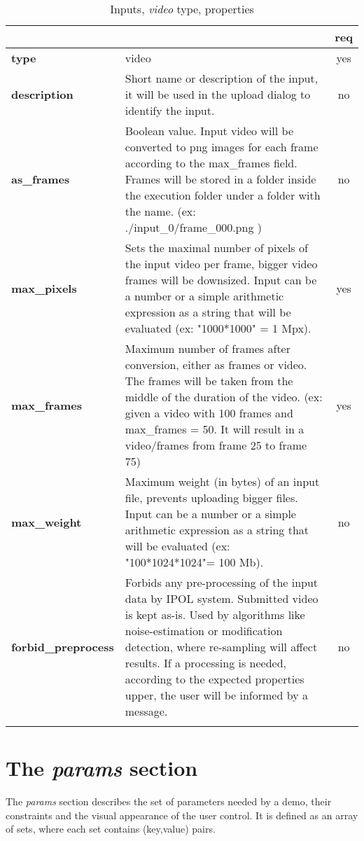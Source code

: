 \begin{longtable}{|>{\bf}L{\linewidth}|L{\linewidth}|c|}
\hline
{}     &  & {\bf req} \tabularnewline 
\hline \hline
 type         & video & yes \\ \hline
 description  & Short name or description of the input, it will be used in the upload dialog to identify the input. & no \\ \hline
 as\_frames & Boolean value. Input video will be converted to png images for each frame according to the max\_frames field. Frames
 will be stored in a folder inside the execution folder under a folder with the name. (ex: ./input\_0/frame\_000.png ) & no \\ \hline
 max\_pixels   &  Sets the maximal number of pixels of the input video per frame, 
bigger video frames will be downsized. 
Input can be a number or a simple arithmetic expression as a string that will be evaluated (ex: "1000*1000" = 1 Mpx).  & yes \\ \hline 
 max\_frames  &  Maximum number of frames after conversion, either as frames or video. The frames will be taken from
 the middle of the duration of the video. (ex: given a video with 100 frames and max\_frames = 50. It will result in a video/frames
 from frame 25 to frame 75) & yes \\ \hline
 max\_weight   & Maximum weight (in bytes) of an input file, prevents uploading bigger files.
Input can be a number or a simple arithmetic expression as a string that will be evaluated (ex: "100*1024*1024"= 100 Mb). & no \\ \hline
forbid\_preprocess         & Forbids any pre-processing of the input data by IPOL system. 
Submitted video is kept as-is.
Used by algorithms like noise-estimation or modification detection, where re-sampling will affect results. 
If a processing is needed, according to the expected properties upper, the user will be informed by a message.
& no \\ \hline
\caption{Inputs, \emph{video} type, properties}
\end{longtable}

\section{The \emph{params} section}
The \emph{params} section describes the set of parameters needed by a demo, their 
constraints and the visual appearance of the user control. It is defined as an array of sets, 
where each set contains (key,value) pairs.


